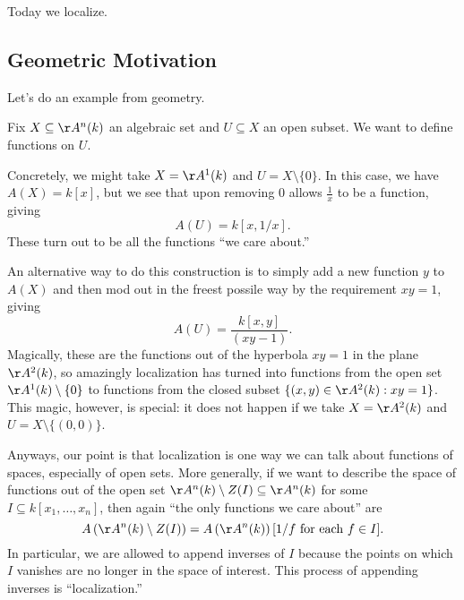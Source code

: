 
Today we localize.

\subsection{Geometric Motivation}
Let's do an example from geometry.

Fix $X\subseteq\AA^n(k)$ an algebraic set and $U\subseteq X$ an open subset. We want to define functions on $U$.
\begin{example}
	Concretely, we might take $X=\AA^1(k)$ and $U=X\setminus\{0\}$. In this case, we have $A(X)=k[x]$, but we see that upon removing $0$ allows $\frac1x$ to be a function, giving
	\[A(U)=k[x,1/x].\]
	These turn out to be all the functions ``we care about.''
\end{example}
An alternative way to do this construction is to simply add a new function $y$ to $A(X)$ and then mod out in the freest possile way by the requirement $xy=1$, giving
\[A(U)=\frac{k[x,y]}{(xy-1)}.\]
Magically, these are the functions out of the hyperbola $xy=1$ in the plane $\AA^2(k)$, so amazingly localization has turned into functions from the open set $\AA^1(k)\setminus\{0\}$ to functions from the closed subset $\{(x,y)\in\AA^2(k):xy=1\}$. This magic, however, is special: it does not happen if we take $X=\AA^2(k)$ and $U=X\setminus\{(0,0)\}$.

Anyways, our point is that localization is one way we can talk about functions of spaces, especially of open sets. More generally, if we want to describe the space of functions out of the open set $\AA^n(k)\setminus Z(I)\subseteq\AA^n(k)$ for some $I\subseteq k[x_1,\ldots,x_n]$, then again ``the only functions we care about'' are
\[A\left(\AA^n(k)\setminus Z(I)\right)=A\left(\AA^n(k)\right)[1/f\text{ for each }f\in I].\]
In particular, we are allowed to append inverses of $I$ because the points on which $I$ vanishes are no longer in the space of interest. This process of appending inverses is ``localization.''

